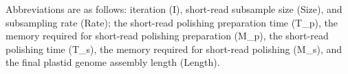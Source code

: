 \begingroup
\scriptsize
\setlength{\parskip}{2pt}

Abbreviations are as follows: 
iteration (I), short-read subsample size (Size), and subsampling rate (Rate);
the short-read polishing preparation time (T_p),
the memory required for short-read polishing preparation (M_p),
the short-read polishing time (T_s),
the memory required for short-read polishing (M_s), and
the final plastid genome assembly length (Length).

\endgroup

